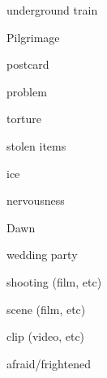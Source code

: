 \documentclass[avery5371,grid,frame]{flashcards}
\begin{document}
\begin{flashcard}{\LARGE underground train}
\LARGE {}
\end{flashcard}
\begin{flashcard}{\LARGE Pilgrimage}
\LARGE {}
\end{flashcard}
\begin{flashcard}{\LARGE postcard}
\LARGE {}
\end{flashcard}
\begin{flashcard}{\LARGE problem}
\LARGE {}
\end{flashcard}
\begin{flashcard}{\LARGE torture}
\LARGE {}
\end{flashcard}
\begin{flashcard}{\LARGE stolen items}
\LARGE {}
\end{flashcard}
\begin{flashcard}{\LARGE ice}
\LARGE {}
\end{flashcard}
\begin{flashcard}{\LARGE nervousness}
\LARGE {}
\end{flashcard}
\begin{flashcard}{\LARGE Dawn}
\LARGE {}
\end{flashcard}
\begin{flashcard}{\LARGE wedding party}
\LARGE {}
\end{flashcard}
\begin{flashcard}{\LARGE shooting (film, etc)}
\LARGE {}
\end{flashcard}
\begin{flashcard}{\LARGE scene (film, etc)}
\LARGE {}
\end{flashcard}
\begin{flashcard}{\LARGE clip (video, etc)}
\LARGE {}
\end{flashcard}
\begin{flashcard}{\LARGE afraid/frightened}
\LARGE {}
\end{flashcard}
\end{document}
